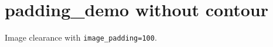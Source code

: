 \documentclass{article}
\begin{document}
\section*{padding\_demo without contour}

Image clearance with \texttt{image\_padding=100}.

\lipsum[1-8]
\end{document}
